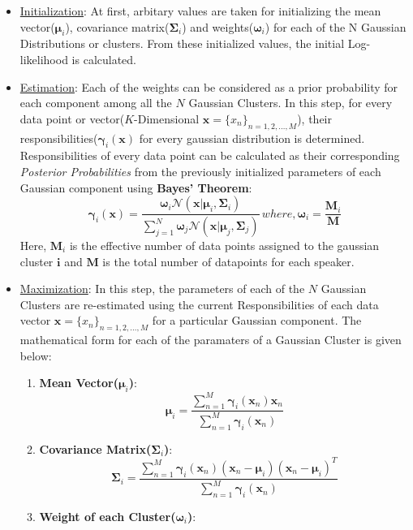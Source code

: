 \documentclass{article}
\begin{document}
\begin{itemize}
\item \underline{Initialization}: At first, arbitary values are taken for initializing the mean vector($\bm\mu_i$), covariance matrix($\bm\Sigma_i$) and weights($\bm\omega_i$) for each of the N Gaussian Distributions or clusters. From these initialized values, the initial Log-likelihood is calculated.
\item \underline{Estimation}: Each of the weights can be considered as a prior probability for each component among all the $N$ Gaussian Clusters. In this step, for every data point or vector($K$-Dimensional $\bm x$$=$$\{x_n\}_{n=1,2,\ldots,M}$), their responsibilities($\bm\gamma_i(\bm x)$ for every gaussian distribution is determined. Responsibilities of every data point can be calculated as their corresponding \textit{Posterior Probabilities} from the previously initialized parameters of each Gaussian component using \textbf{Bayes' Theorem}:
\begin{equation}
\bm\gamma_i(\bm x) = \frac{\bm\omega_i\mathcal{N}(\bm x|\bm\mu_i,\bm\Sigma_i)}{\sum\limits_{j=1}^N \bm\omega_j\mathcal{N}(\bm x|\bm\mu_j,\bm\Sigma_j)}\,where, \bm\omega_i = \frac{\bm M_i}{\bm M}
\end{equation}
Here, $\bm M_i$ is the effective number of data points assigned to the gaussian cluster $\bm i$ and $\bm M$ is the total number of datapoints for each speaker.
\item \underline{Maximization}: In this step, the parameters of each of the $N$ Gaussian Clusters are re-estimated using the current Responsibilities of each data vector $\bm x$$=$$\{x_n\}_{n=1,2,\ldots,M}$ for a particular Gaussian component. The mathematical form for each of the paramaters of a Gaussian Cluster is given below:
\begin{enumerate}
\item \textbf{Mean Vector($\bm\mu_i$)}:
\begin{equation}
\bm\mu_i = \frac{\sum\limits_{n=1}^M\bm\gamma_i(\bm x_n)\bm x_n}{\sum\limits_{n=1}^M\bm\gamma_i(\bm x_n)}
\end{equation}
\item \textbf{Covariance Matrix($\bm\Sigma_i$)}:
\begin{equation}
\bm\Sigma_i = \frac{\sum\limits_{n=1}^M\bm\gamma_i(\bm x_n)(\bm x_n-\bm\mu_i)(\bm x_n-\bm\mu_i)^T}{\sum\limits_{n=1}^M\bm\gamma_i(\bm x_n)}
\end{equation}
\item \textbf{Weight of each Cluster($\bm\omega_i$)}:

\end{enumerate}
\end{itemize}
\end{document}
